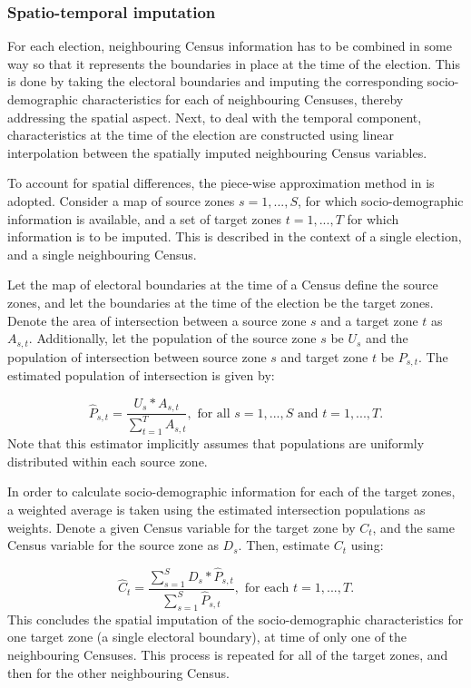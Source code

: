 \documentclass[11pt,a4paper,]{article}
\begin{document}
\hypertarget{spatio-temporal-imputation}{%
\subsubsection{Spatio-temporal imputation}\label{spatio-temporal-imputation}}

For each election, neighbouring Census information has to be combined in some way so that it represents the boundaries in place at the time of the election. This is done by taking the electoral boundaries and imputing the corresponding socio-demographic characteristics for each of neighbouring Censuses, thereby addressing the spatial aspect. Next, to deal with the temporal component, characteristics at the time of the election are constructed using linear interpolation between the spatially imputed neighbouring Census variables.

To account for spatial differences, the piece-wise approximation method in \textcite{Goodchild1993} is adopted. Consider a map of source zones \(s = 1,...,S\), for which socio-demographic information is available, and a set of target zones \(t = 1,...,T\) for which information is to be imputed. This is described in the context of a single election, and a single neighbouring Census.

Let the map of electoral boundaries at the time of a Census define the source zones, and let the boundaries at the time of the election be the target zones. Denote the area of intersection between a source zone \(s\) and a target zone \(t\) as \(A_{s,t}\). Additionally, let the population of the source zone \(s\) be \(U_s\) and the population of intersection between source zone \(s\) and target zone \(t\) be \(P_{s,t}\). The estimated population of intersection is given by:

\[\hat{P}_{s,t} = \frac{U_s*A_{s,t}}{\sum_{t=1}^T A_{s,t}}, \mbox{ for all } s=1,...,S \mbox{ and } t=1,...,T.\]
Note that this estimator implicitly assumes that populations are uniformly distributed within each source zone.

In order to calculate socio-demographic information for each of the target zones, a weighted average is taken using the estimated intersection populations as weights. Denote a given Census variable for the target zone by \(C_t\), and the same Census variable for the source zone as \(D_s\). Then, estimate \(C_t\) using:

\[\hat{C}_t = \frac{\sum_{s=1}^{S}{D_s*\hat{P}_{s,t}}}{\sum_{s=1}^{S}{\hat{P}_{s,t}}}, \mbox{ for each } t=1,...,T.\]
This concludes the spatial imputation of the socio-demographic characteristics for one target zone (a single electoral boundary), at time of only one of the neighbouring Censuses. This process is repeated for all of the target zones, and then for the other neighbouring Census.
\end{document}
